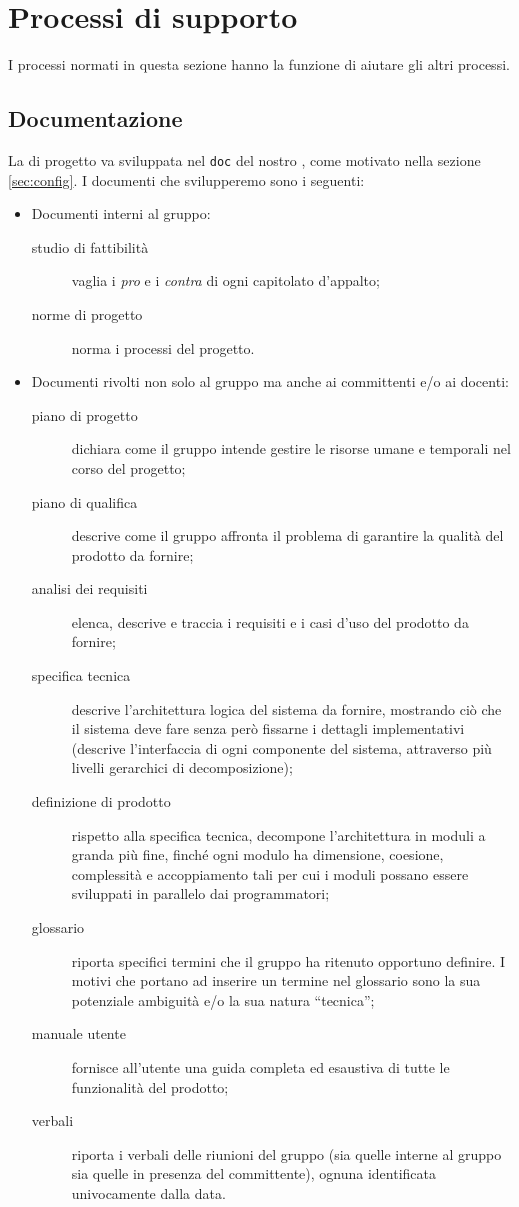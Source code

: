 
\section{Processi di supporto} \label{sec:supporto}
	I processi normati in questa sezione hanno la funzione di aiutare gli altri processi.
	\subsection{Documentazione} \label{sec:doc}
		La  di progetto va sviluppata nel  \texttt{doc} del nostro , come motivato nella sezione \ref{sec:config}. I documenti che svilupperemo sono i seguenti:
		\begin{itemize}
			\item Documenti interni al gruppo:
			\begin{description}
				\item[studio di fattibilità] vaglia i \emph{pro} e i \emph{contra} di ogni capitolato d'appalto;
				\item[norme di progetto] norma i processi del progetto.
			\end{description}
			\item Documenti rivolti non solo al gruppo ma anche ai committenti e/o ai docenti:
			\begin{description}
				\item[piano di progetto] dichiara come il gruppo intende gestire le risorse umane e temporali nel corso del progetto;
				\item[piano di qualifica] descrive come il gruppo affronta il problema di garantire la qualità del prodotto da fornire;
				\item[analisi dei requisiti] elenca, descrive e traccia i requisiti e i casi d'uso del prodotto da fornire;
				\item[specifica tecnica] descrive l'architettura logica del sistema da fornire, mostrando ciò che il sistema deve fare senza però fissarne i dettagli implementativi (descrive l'interfaccia di ogni componente del sistema, attraverso più livelli gerarchici di decomposizione);
				\item[definizione di prodotto] rispetto alla specifica tecnica, decompone l'architettura in moduli a granda più fine, finché ogni modulo ha dimensione, coesione, complessità e accoppiamento tali per cui i moduli possano essere sviluppati in parallelo dai programmatori;
				\item[glossario] riporta specifici termini che il gruppo ha ritenuto opportuno definire. I motivi che portano ad inserire un termine nel glossario sono la sua potenziale ambiguità e/o la sua natura “tecnica”;
				\item[manuale utente] fornisce all'utente una guida completa ed esaustiva di tutte le funzionalità del prodotto;
				\item[verbali] riporta i verbali delle riunioni del gruppo (sia quelle interne al gruppo sia quelle in presenza del committente), ognuna identificata univocamente dalla data.
			\end{description}
		\end{itemize}
